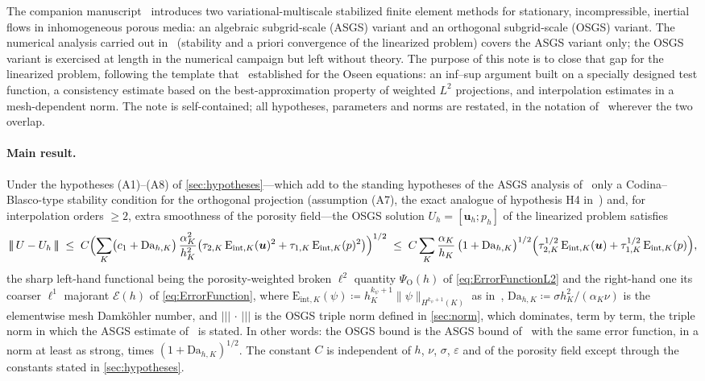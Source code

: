\documentclass[11pt]{article}
\theoremstyle{remark}
\newcommand{\bu}{\boldsymbol{u}}
\newcommand{\norm}[1]{\lVert #1 \rVert}
\newcommand{\tnorm}[1]{\lvert\!\lvert\!\lvert\, #1 \,\rvert\!\rvert\!\rvert}
\newcommand{\Eint}[2]{\mathrm{E}_{\mathrm{int},#1}(#2)}
\newcommand{\Dah}{\mathrm{Da}_{h,K}}
\begin{document}
The companion manuscript~\cite{companion} introduces two variational-multiscale
stabilized finite element methods for stationary, incompressible, inertial flows in
inhomogeneous porous media: an algebraic subgrid-scale (ASGS) variant and an
orthogonal subgrid-scale (OSGS) variant. The numerical analysis carried out
in~\cite{companion} (stability and a priori convergence of the linearized problem)
covers the ASGS variant only; the OSGS variant is exercised at length in the numerical
campaign but left without theory. The purpose of this note is to close that gap for the
linearized problem, following the template that~\cite{Codina2008} established for the
Oseen equations: an inf--sup argument built on a specially designed test function, a
consistency estimate based on the best-approximation property of weighted $L^2$
projections, and interpolation estimates in a mesh-dependent norm. The note is
self-contained; all hypotheses, parameters and norms are restated, in the notation
of~\cite{companion} wherever the two overlap.

\paragraph{Main result.}
Under the hypotheses (A1)--(A8) of \cref{sec:hypotheses}---which add to the standing
hypotheses of the ASGS analysis of~\cite{companion} only a Codina--Blasco-type stability
condition for the orthogonal projection (assumption (A7), the exact analogue of
hypothesis H4 in~\cite{Codina2008}) and, for interpolation orders $\ge 2$, extra smoothness
of the porosity field---the OSGS solution $U_h = [\bu_h; p_h]$ of the linearized problem
satisfies
\begin{equation}
  \label{eq:MainResultIntro}
  \tnorm{U - U_h}
  \;\le\;
  C \Bigl( \sum_{K} \bigl(c_1 + \Dah\bigr)\,\frac{\alpha_K^2}{h_K^2}
  \bigl( \tau_{2,K}\,\Eint{K}{\bu}^2 + \tau_{1,K}\,\Eint{K}{p}^2 \bigr) \Bigr)^{1/2}
  \;\le\;
  C \sum_{K}
  \frac{\alpha_K}{h_K}\,\bigl(1 + \Dah\bigr)^{1/2}
  \Bigl( \tau_{2,K}^{1/2}\,\Eint{K}{\bu} + \tau_{1,K}^{1/2}\,\Eint{K}{p} \Bigr),
\end{equation}
the sharp left-hand functional being the porosity-weighted broken $\ell^2$
quantity $\Psi_{\mathrm O}(h)$ of \cref{eq:ErrorFunctionL2} and the right-hand one its
coarser $\ell^1$ majorant $\mathcal{E}(h)$ of \cref{eq:ErrorFunction},
where $\Eint{K}{\psi} \coloneqq h_K^{k_\psi+1}\norm{\psi}_{H^{k_\psi+1}(K)}$ as
in~\cite{companion}, $\Dah \coloneqq \sigma h_K^2/(\alpha_K\nu)$ is the elementwise mesh
Damk\"ohler number, and $\tnorm{\cdot}$ is the OSGS triple norm defined in
\cref{sec:norm}, which dominates, term by term, the triple norm in which the ASGS
estimate of~\cite{companion} is stated. In other words: the OSGS bound is the ASGS bound
of~\cite{companion} with the same error function, in a norm at least as strong, times
$(1+\Dah)^{1/2}$. The constant $C$ is independent of $h$, $\nu$, $\sigma$,
$\varepsilon$ and of the porosity field except through the constants stated in
\cref{sec:hypotheses}.
\end{document}
